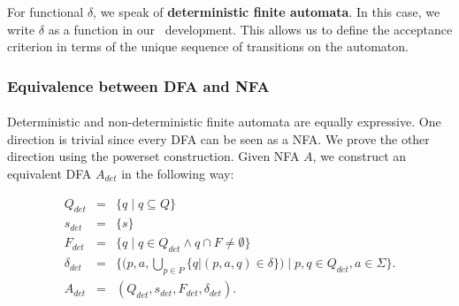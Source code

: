 

For functional $\delta$, we speak of \textbf{deterministic finite automata}. 
In this case, we write $\delta$ as a function in our \coq\ development. 
This allows us to define the acceptance criterion in terms of the unique sequence of transitions on the automaton. 




\subsubsection{Equivalence between DFA and NFA}
\paragraph{} 
Deterministic and non-deterministic finite automata are equally expressive. 
One direction is trivial since every DFA can be seen as a NFA. 
We prove the other direction using the powerset construction. 
Given NFA $A$, we construct an equivalent DFA $A_{det}$ in the following way:

    \begin{eqnarray*}
        Q_{det} & = & \{q \; | \; q \subseteq Q\} \\
        {s}_{det} & = & \{ s \} \\
        F_{det} & = & \{ q \; | \; q \in Q_{det} \wedge q \cap F \neq \emptyset \} \\
        \delta_{det} & = & \{ (p,a,\bigcup \limits _{p \in P} \{ q | (p,a,q) \in \delta \}) \; | \; p, q \in Q_{det}, a \in \Sigma \}.     \\
        A_{det} &=&  (Q_{det}, s_{det}, F_{det}, \delta_{det}).
    \end{eqnarray*}

